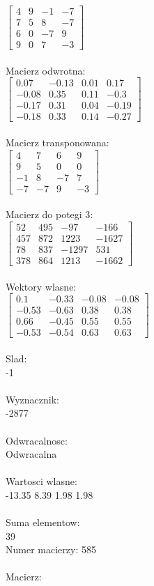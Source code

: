 \documentclass[a4paper,12pt]{article}
\begin{document}
$\begin{bmatrix} 4&9&-1&-7\\7&5&8&-7\\6&0&-7&9\\9&0&7&-3 \end{bmatrix}$
\\
\\
Macierz odwrotna:\\

$\begin{bmatrix} 0.07&-0.13&0.01&0.17\\-0.08&0.35&0.11&-0.3\\-0.17&0.31&0.04&-0.19\\-0.18&0.33&0.14&-0.27 \end{bmatrix}$
\\
\\
Macierz transponowana:\\

$\begin{bmatrix} 4&7&6&9\\9&5&0&0\\-1&8&-7&7\\-7&-7&9&-3 \end{bmatrix}$
\\
\\
Macierz do potegi 3:\\

$\begin{bmatrix} 52&495&-97&-166\\457&872&1223&-1627\\78&837&-1297&531\\378&864&1213&-1662 \end{bmatrix}$
\\
\\
Wektory wlasne:\\

$\begin{bmatrix} 0.1&-0.33&-0.08&-0.08\\-0.53&-0.63&0.38&0.38\\0.66&-0.45&0.55&0.55\\-0.53&-0.54&0.63&0.63 \end{bmatrix}$
\\
\\
Slad:\\
-1
\\
\\
Wyznacznik:\\
-2877
\\
\\
Odwracalnosc:\\
Odwracalna
\\
\\
Wartosci wlasne:\\
-13.35 8.39 1.98 1.98
\\
\\
Suma elementow:\\
39
\\
\newpage
Numer macierzy:
585
\\
\\
Macierz:\\
\end{document}
